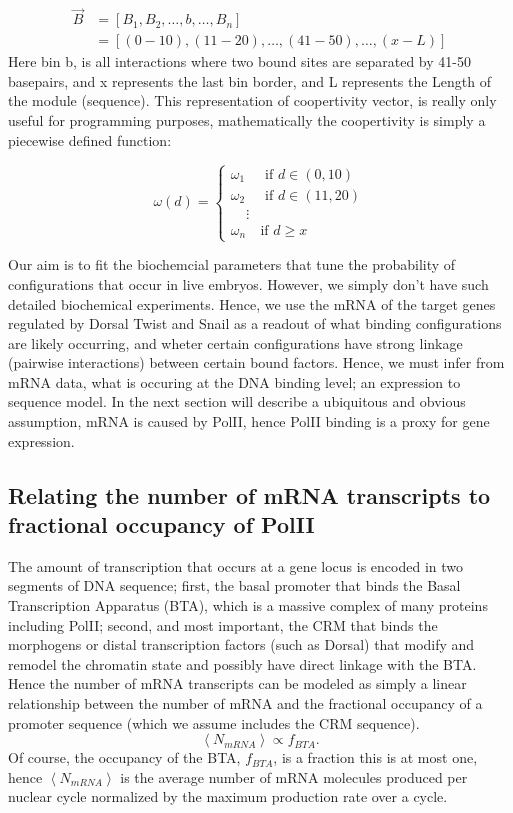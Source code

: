 \begin{equation}\label{}
\begin{split}
 \overrightarrow{B}   &= [ B_1 ,B_2 ,\ldots, b, \ldots, B_n ] \\
     &=   [ (0-10), (11-20), \ldots,(41-50),\ldots, (x-L)]
    \end{split}
\end{equation}
Here bin b, is all interactions where two bound sites are separated by 41-50 basepairs, and x represents the last bin border, and L represents the Length of the module (sequence).  This representation of coopertivity vector, is really only useful for programming purposes, mathematically the coopertivity is simply a piecewise defined function:


\[
  \omega(d) =
  \begin{cases}
   \omega_1  & \text{ if } d \in (0,10)  \\
   \omega_2  & \text{ if } d \in (11,20)  \\
   \ \ \ \ \ \vdots \\
 \omega_n  & \text{if } d \geq x
  \end{cases}
\]

Our aim is to fit the biochemcial parameters that tune the probability of configurations that occur in live embryos.  However, we simply don't have such detailed biochemical experiments.  Hence, we use the mRNA of the target genes regulated by Dorsal Twist and Snail as a readout of what binding configurations are likely occurring, and wheter certain configurations have strong linkage (pairwise interactions) between certain bound factors.  Hence, we must infer from mRNA data, what is occuring at the DNA binding level; an expression to sequence model.  In the next section will describe a ubiquitous and obvious assumption, mRNA is caused by PolII, hence PolII binding is a proxy for gene expression.
 
\subsection{Relating the number of mRNA transcripts to fractional occupancy of PolII }
The amount of transcription that occurs at a gene locus is encoded in two segments of DNA sequence; first, the basal promoter that binds the Basal Transcription Apparatus (BTA), which is a massive complex of many proteins including PolII; second, and most important, the CRM that binds the morphogens or distal transcription factors (such as Dorsal) that modify and remodel the chromatin state and possibly have direct linkage with the BTA.  Hence the number of mRNA transcripts can be modeled as simply a linear relationship between the number of mRNA and the fractional occupancy of a promoter sequence (which we assume includes the CRM sequence).
\begin{equation}\label{}
     \left< N_{mRNA} \right>  \propto f_{BTA}.
\end{equation}
Of course, the occupancy of the BTA, $f_{BTA}$,  is a fraction this is at most one, hence $\left< N_{mRNA} \right> $ is the average number of mRNA molecules produced per nuclear cycle normalized by the maximum production rate over a cycle. 



 


